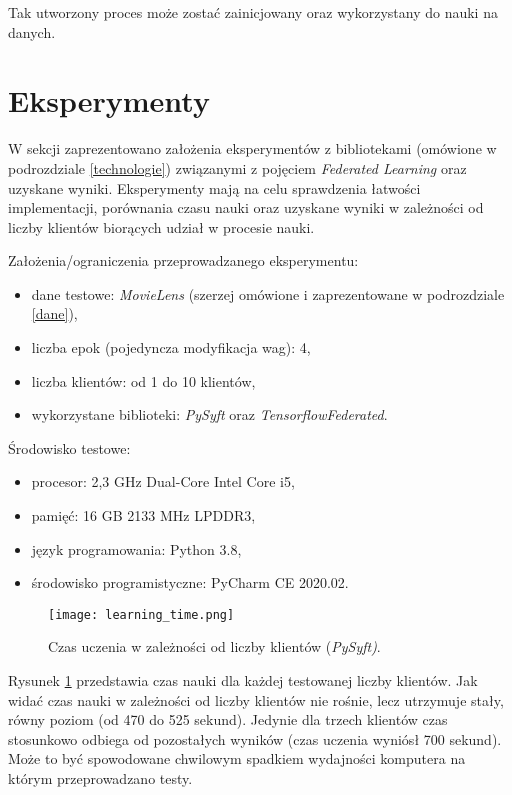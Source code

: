 Tak utworzony proces może zostać zainicjowany oraz wykorzystany do nauki na danych.

\section{Eksperymenty}

W sekcji zaprezentowano założenia eksperymentów z bibliotekami (omówione w podrozdziale \ref{technologie}) związanymi z pojęciem \textit{Federated Learning} oraz uzyskane wyniki. Eksperymenty mają na celu sprawdzenia łatwości implementacji, porównania czasu nauki oraz uzyskane wyniki w zależności od liczby klientów biorących udział w procesie nauki.

Założenia/ograniczenia przeprowadzanego eksperymentu:
\begin{itemize}
    \item dane testowe: \textit{MovieLens} (szerzej omówione i zaprezentowane w podrozdziale \ref{dane}),
    \item liczba epok (pojedyncza modyfikacja wag): 4,
    \item liczba klientów: od 1 do 10 klientów,
    \item wykorzystane biblioteki: \textit{PySyft} oraz \textit{TensorflowFederated}.
\end{itemize}

Środowisko testowe:
\begin{itemize}
    \item procesor: 2,3 GHz Dual-Core Intel Core i5,
    \item pamięć: 16 GB 2133 MHz LPDDR3,
    \item język programowania: Python 3.8,
    \item środowisko programistyczne: PyCharm CE 2020.02.
\end{itemize}

\begin{figure}[h]
    \texttt{[image: learning\_time.png]}
    \caption{Czas uczenia w zależności od liczby klientów (\textit{PySyft)}.}
    \label{fig:learning_time}
\end{figure}

Rysunek \ref{fig:learning_time} przedstawia czas nauki dla każdej testowanej liczby klientów. Jak widać czas nauki w zależności od liczby klientów nie rośnie, lecz utrzymuje stały, równy poziom (od 470 do 525 sekund). Jedynie dla trzech klientów czas stosunkowo odbiega od pozostałych wyników (czas uczenia wyniósł 700 sekund). Może to być spowodowane chwilowym spadkiem wydajności komputera na którym przeprowadzano testy.

